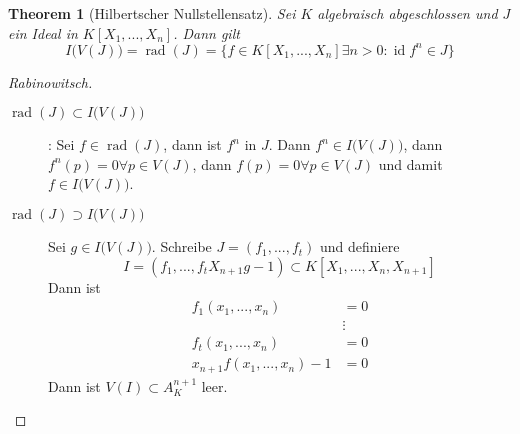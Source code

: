\documentclass[10pt,a4paper]{article}
\newcommand{\id}{\operatorname{id}}
\newcommand{\rad}{\operatorname{rad}}
\theoremstyle{plain}
\newtheorem{theorem}{Theorem}[section]
\theoremstyle{definition}
\theoremstyle{remark}
\begin{document}
	\begin{theorem}[Hilbertscher Nullstellensatz]
		Sei $K$ algebraisch abgeschlossen und $J$ ein Ideal in $K[X_1,...,X_n]$. Dann gilt
		\[I\big(V(J)\big)=\rad(J)=\{f\in K[X_1,...,X_n]\exists n>0:\id f^n\in J\}\]
	\end{theorem}
	\begin{proof}[Rabinowitsch]
		\begin{description}
			\item[$\rad(J)\subset I\big(V(J)\big)$]: Sei $f\in \rad(J)$, dann ist $f^n$ in $J$. Dann $f^n\in I\big(V(J)\big)$, dann $f^n(p)=0\forall p\in V(J)$, dann $f(p)=0\forall p\in V(J)$ und damit $f\in I\big(V(J)\big)$.
			\item[$\rad(J)\supset I\big(V(J)\big)$] Sei $g\in I\big(V(J)\big)$. Schreibe $J=(f_1,...,f_t)$ und definiere
			\[I=(f_1,...,f_tX_{n+1}g-1)\subset K[X_1,...,X_n,X_{n+1}]\]
			Dann ist
			\begin{align*}
			f_1(x_1,...,x_n)&=0\\
			&\vdots\\
			f_t(x_1,...,x_n)&=0\\
			x_{n+1}f(x_1,...,x_n)-1&=0
			\end{align*}
			Dann ist $V(I)\subset A_K^{n+1}$ leer.\\
		\end{description}
	\end{proof}
\end{document}
